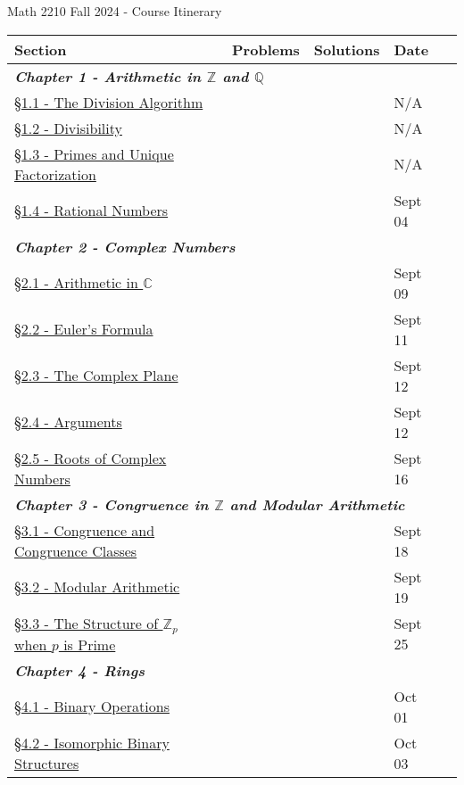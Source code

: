 \documentclass{article}
\newcommand{\chaptercolor}{RoyalBlue!35}
\begin{document}
\large
\begin{center}
{\Huge Math 2210 Fall 2024 - Course Itinerary}
\vspace{0.25cm}

\begin{tabular}{|l|l|l|l|l|l|}
\cellcolor{black!85}\color{white}Section & \cellcolor{black!85}\color{white}\phantom{-----------} & \cellcolor{black!85}\color{white}Problems & \cellcolor{black!85}\color{white}Solutions & \cellcolor{black!85}\color{white}Date\\
%
\hline
%
\multicolumn{5}{|l|}{\cellcolor{\chaptercolor} \textit{\textbf{Chapter 1 - Arithmetic in $\mathbb{Z}$ and $\mathbb{Q}$}}}\\
\hline
\href{}{\S1.1 - The Division Algorithm} & & & & \phantom{--}N/A\\
\href{}{\S1.2 - Divisibility} & & & & \phantom{--}N/A\\
\href{}{\S1.3 - Primes and Unique Factorization} & & & & \phantom{--}N/A\\
\href{}{\S1.4 - Rational Numbers} & & & & Sept 04\\
\hline
\multicolumn{5}{|l|}{\cellcolor{\chaptercolor} \textit{\textbf{Chapter 2 - Complex Numbers}}}\\
\hline
\href{}{\S2.1 - Arithmetic in $\mathbb{C}$} & & & & Sept 09\\
\href{}{\S2.2 - Euler's Formula} & & & & Sept 11\\
\href{}{\S2.3 - The Complex Plane} & & & & Sept 12\\
\href{}{\S2.4 - Arguments} & & & & Sept 12\\
\href{}{\S2.5 - Roots of Complex Numbers} & & & & Sept 16\\
\hline
\multicolumn{5}{|l|}{\cellcolor{\chaptercolor} \textit{\textbf{Chapter 3 - Congruence in $\mathbb{Z}$ and Modular Arithmetic}}}\\
\hline
\href{}{\S3.1 - Congruence and Congruence Classes} & & & & Sept 18\\
\href{}{\S3.2 - Modular Arithmetic} & & & & Sept 19\\
\href{}{\S3.3 - The Structure of $\mathbb{Z}_{p}$ when $p$ is Prime} & & & & Sept 25\\
\hline
\multicolumn{5}{|l|}{\cellcolor{\chaptercolor} \textit{\textbf{Chapter 4 - Rings}}}\\
\hline
\href{}{\S4.1 - Binary Operations} & & & & Oct 01\\
\href{}{\S4.2 - Isomorphic Binary Structures} & & & & Oct 03\\

\end{tabular}
\end{center}
\end{document}
